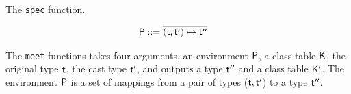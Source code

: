 \documentclass[a4paper,USenglish]{tex/lipics-v2016}
\begin{document}
The \texttt{spec} function.

\hrulefill

\opdef{
  $\meett{\P, \K, \t, \tp} = {\tpp}~\K$
}{
}
\begin{align*}
\P &::= \b{(\t,\tp) \mapsto \tpp}
\end{align*}

\begin{mathpar}





\end{mathpar}

The \texttt{meet} functions takes four arguments, an environment $\P$, a class table $\K$, the original type $\t$, the cast type $\tp$, 
and outputs a type $\tpp$ and a class table $\Kp$. The environment $\P$ is a set of mappings from a pair of types ($\t,\tp$) to a type $\tpp$.


\hrulefill

\opdef{
  $\meett{\P, \K, {\Type{\b\mt}}, {\Type{\b\mt}}} = {\Type{\b\mt}}~\K$
}{
}
\end{document}
